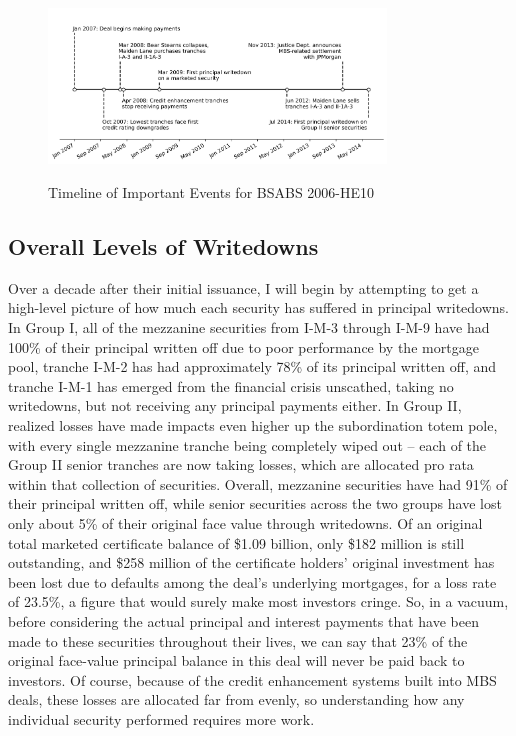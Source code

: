 \documentclass[12pt]{article}
\begin{document}
\begin{figure}[h]
	\centering
	\caption{Timeline of Important Events for BSABS 2006-HE10}
	\includegraphics[width=0.8\textwidth]{../figures/timeline_of_important_events}
	\label{fig:timeline_of_important_events}
\end{figure}

\subsection*{Overall Levels of Writedowns}

Over a decade after their initial issuance, I will begin by attempting to get a high-level picture of how much each security has suffered in principal writedowns. In Group I, all of the mezzanine securities from I-M-3 through I-M-9 have had 100\% of their principal written off due to poor performance by the mortgage pool, tranche I-M-2 has had approximately 78\% of its principal written off, and tranche I-M-1 has emerged from the financial crisis unscathed, taking no writedowns, but not receiving any principal payments either. In Group II, realized losses have made impacts even higher up the subordination totem pole, with every single mezzanine tranche being completely wiped out -- each of the Group II senior tranches are now taking losses, which are allocated pro rata within that collection of securities. Overall, mezzanine securities have had 91\% of their principal written off, while senior securities across the two groups have lost only about 5\% of their original face value through writedowns. Of an original total marketed certificate balance of \$1.09 billion, only \$182 million is still outstanding, and \$258 million of the certificate holders’ original investment has been lost due to defaults among the deal’s underlying mortgages, for a loss rate of 23.5\%, a figure that would surely make most investors cringe. So, in a vacuum, before considering the actual principal and interest payments that have been made to these securities throughout their lives, we can say that 23\% of the original face-value principal balance in this deal will never be paid back to investors. Of course, because of the credit enhancement systems built into MBS deals, these losses are allocated far from evenly, so understanding how any individual security performed requires more work.
\end{document}
